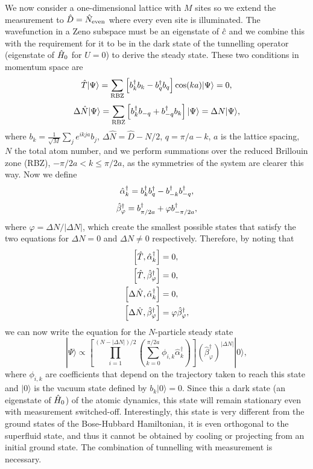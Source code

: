 We now consider a one-dimensional lattice with $M$ sites so we extend
the measurement to $\hat{D} = \hat{N}_\text{even}$ where every even site is
illuminated.  The wavefunction in a Zeno subspace must be an
eigenstate of $\hat{c}$ and we combine this with the requirement for it to
be in the dark state of the tunnelling operator (eigenstate of $\hat{H}_0$
for $U = 0$) to derive the steady state. These two conditions in
momentum space are
\begin{equation}
  \hat{T} | \Psi \rangle = \sum_{\text{RBZ}} \left[ b^\dagger_k b_k -
    b^\dagger_{q} b_{q} \right] \cos(ka) |\Psi \rangle = 0,
\end{equation}
\begin{equation}
  \Delta \hat{N} |\Psi \rangle = \sum_{\text{RBZ}} \left[ b^\dagger_k b_{-q} +
    b^\dagger_{-q} b_k \right] | \Psi \rangle= \Delta N |\Psi \rangle,
\end{equation}
where $b_k = \frac{1}{\sqrt{M}} \sum_j e^{i k j a} b_j$,
$\Delta \hat{N} = \hat{D} - N/2$, $q = \pi/a - k$, $a$ is the lattice
spacing, $N$ the total atom number, and we perform summations over the
reduced Brillouin zone (RBZ), $-\pi/2a < k \le \pi/2a$, as the
symmetries of the system are clearer this way. Now we define
\begin{equation}
\hat{\alpha}_k^\dagger = b^\dagger_k b^\dagger_q - b^\dagger_{-k} b^\dagger_{-q},
\end{equation}
\begin{equation}
\hat{\beta}_\varphi^\dagger = b^\dagger_{\pi/2a} + \varphi b^\dagger_{-\pi/2a},
\end{equation}
where $\varphi = \Delta N / | \Delta N |$, which create the smallest
possible states that satisfy the two equations for $\Delta N = 0$ and
$\Delta N \ne 0$ respectively. Therefore, by noting that
\begin{align}
  \left[ \hat{T}, \hat{\alpha}_k^\dagger \right] & = 0, \\
  \left[ \hat{T}, \hat{\beta}_\varphi^\dagger \right] & = 0, \\
  \left[ \Delta \hat{N}, \hat{\alpha}_k^\dagger \right] & = 0, \\
  \left[ \Delta \hat{N}, \hat{\beta}_\varphi^\dagger \right] & = \varphi
  \hat{\beta}_\varphi^\dagger,
\end{align}
we can now write the equation for the $N$-particle steady state
\begin{equation}
  \label{eq:ss}
  | \Psi \rangle \propto \left[ \prod_{i=1}^{(N - |\Delta N|)/2}
    \left( \sum_{k = 0}^{\pi/2a} \phi_{i,k} \hat{\alpha}_k^\dagger
    \right) \right] \left( \hat{\beta}_\varphi^\dagger \right)^{|
    \Delta N |} | 0 \rangle,
\end{equation}
where $\phi_{i,k}$ are coefficients that depend on the trajectory
taken to reach this state and $|0 \rangle$ is the vacuum state defined
by $b_k |0 \rangle = 0$. Since this a dark state (an eigenstate of
$\hat{H}_0$) of the atomic dynamics, this state will remain stationary even
with measurement switched-off. Interestingly, this state is very
different from the ground states of the Bose-Hubbard Hamiltonian, it
is even orthogonal to the superfluid state, and thus it cannot be
obtained by cooling or projecting from an initial ground state. The
combination of tunnelling with measurement is necessary.

